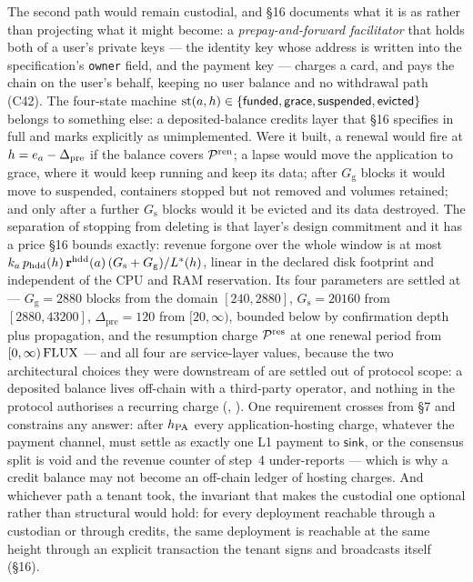 The second path would remain custodial, and \S16 documents what it is as \shipped rather than
projecting what it might become: a \emph{prepay-and-forward facilitator} that holds both of a user's
private keys --- the identity key whose address is written into the specification's \texttt{owner}
field, and the payment key --- charges a card, and pays the chain on the user's behalf, keeping no
user balance and no withdrawal path (C42). The four-state machine
$\mathrm{st}(a,h) \in \{\textsf{funded}, \textsf{grace}, \textsf{suspended}, \textsf{evicted}\}$
belongs to something else: a deposited-balance credits layer that \S16 specifies in full and marks
explicitly as unimplemented. Were it built, a renewal would fire at
$h = e_{a} - \Delta_{\mathrm{pre}}$ if the balance covers $\mathcal{P}^{\mathrm{ren}}$; a lapse would
move the application to \textsf{grace}, where it would keep running and keep its data; after
$G_{\mathrm{g}}$ blocks it would move to \textsf{suspended}, containers stopped but not removed and
volumes retained; and only after a further $G_{\mathrm{s}}$ blocks would it be \textsf{evicted} and
its data destroyed. The separation of stopping from deleting is that layer's design commitment and it
has a price \S16 bounds exactly: revenue forgone over the whole window is at most
$k_{a}\,p_{\mathrm{hdd}}(h)\,\mathbf{r}^{\mathrm{hdd}}(a)\,(G_{\mathrm{s}} +
G_{\mathrm{g}})/L^{\ast}(h)$, linear in the declared disk footprint and independent of the CPU and
RAM reservation. Its four parameters are settled at  --- $G_{\mathrm{g}} =
\num{2880}$ blocks from the domain $[240, 2880]$, $G_{\mathrm{s}} = \num{20160}$ from
$[2880, 43200]$, $\Delta_{\mathrm{pre}} = \num{120}$ from $[20,\infty)$, bounded below by
confirmation depth plus propagation, and the resumption charge $\mathcal{P}^{\mathrm{res}}$ at one renewal
period from $[0,\infty)\,\mathrm{FLUX}$ --- and all four are service-layer values, because the two
architectural choices they were downstream of are settled out of protocol scope: a deposited balance
lives off-chain with a third-party operator, and nothing in the protocol authorises a recurring
charge (, ). One requirement crosses from
\S7 and constrains any answer: after $h_{\mathrm{PA}}$ every
application-hosting charge, whatever the payment channel, must settle as exactly one L1 payment to
$\mathsf{sink}$, or the consensus split is void and the revenue counter of step~4 under-reports ---
which is why a credit balance may not become an off-chain ledger of hosting charges. And whichever
path a tenant took, the invariant that makes the custodial one optional rather than structural would
hold: for every deployment reachable through a custodian or through credits, the same deployment is
reachable at the same height through an explicit transaction the tenant signs and broadcasts itself
(\S16).

